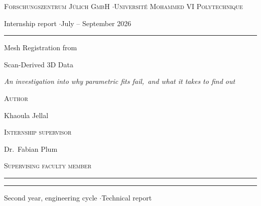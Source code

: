 \begin{titlepage}
\thispagestyle{empty}
\raggedright
\vspace*{0.08\textheight}

{\footnotesize\scshape\color{graphite}
Forschungszentrum Jülich GmbH \quad$\cdot$\quad Université Mohammed VI Polytechnique\par
Internship report \quad$\cdot$\quad July -- September 2026\par}

\vspace{0.8\baselineskip}
\textcolor{rule}{\rule{\linewidth}{0.5pt}}
\vspace{2.0\baselineskip}

{\displayfont\fontsize{30}{34}\selectfont
Mesh Registration from\par
Scan-Derived 3D Data\par}

\vspace{0.8\baselineskip}
{\large\color{graphite}\itshape
An investigation into why parametric fits fail,\
 and what it takes to find out\par}

\vspace{2.8\baselineskip}
{\footnotesize\scshape\color{graphite}Author\par}
{\large Khaoula Jellal\par}

\vspace{1.0\baselineskip}
{\footnotesize\scshape\color{graphite}Internship supervisor\par}
{\large Dr.\ Fabian Plum\par}

\vspace{1.0\baselineskip}
{\footnotesize\scshape\color{graphite}Supervising faculty member\par}
{\large \rule{0.42\linewidth}{0.4pt}\par}

\vfill
\textcolor{rule}{\rule{\linewidth}{0.5pt}}
\vspace{0.5\baselineskip}
{\footnotesize\color{graphite}
Second year, engineering cycle \quad$\cdot$\quad Technical report\par}
\end{titlepage}
